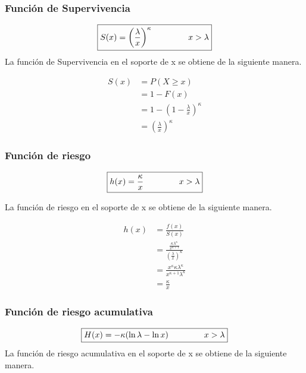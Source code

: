 \documentclass[10pt,a4paper]{article}
\begin{document}
\subsubsection*{Funci\'on de Supervivencia}
\begin{equation*}
\boxed{
S(x) =\left( \frac{\lambda}{x} \right) ^ \kappa \hspace{1.5cm} x > \lambda}
\end{equation*}
\newpage
La función de Supervivencia en el soporte de x se obtiene de la siguiente manera.

\begin{align*}
S(x) &= P(X \geqslant x) \\
     &= 1 - F(x) \\
     &= 1 - \left(1-\frac{\lambda}{x} \right)^\kappa  \\
     &=\left( \frac{\lambda}{x} \right) ^ \kappa
\end{align*}

\subsubsection*{Funci\'on de riesgo}
\begin{equation*}
\boxed{
h(x) = \frac{\kappa}{x}  \hspace{1.5cm} x > \lambda}
\end{equation*}

La función de riesgo en el soporte de x se obtiene de la siguiente manera.

\begin{align*}
h(x) &= \frac{f(x)}{S(x)} \\
     &= \frac{\frac{\kappa \lambda ^ \kappa}{ x^{\kappa+1}}}{\left( \frac{\lambda}{x} \right) ^ \kappa} \\
     &= \frac{x^\kappa \kappa \lambda^\kappa}{x^{\kappa+1} \lambda^\kappa}   \\
     &= \frac{\kappa}{x}
\end{align*}

\subsubsection*{Funci\'on de riesgo acumulativa}
\begin{equation*}
\boxed{
H(x) = -\kappa (\ln \lambda - \ln x)  \hspace{1.5cm} x > \lambda}
\end{equation*}
La función de riesgo acumulativa en el soporte de x se obtiene de la siguiente manera.
\end{document}

